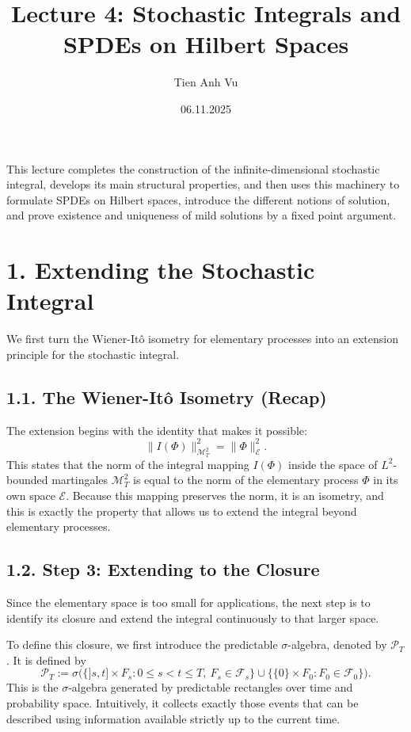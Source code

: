 \documentclass[11pt]{article}
\title{Lecture 4: Stochastic Integrals and SPDEs on Hilbert Spaces}
\date{06.11.2025}
\author{Tien Anh Vu}
\theoremstyle{definition}
\theoremstyle{remark}
\begin{document}
\maketitle

This lecture completes the construction of the infinite-dimensional stochastic integral, develops its main structural properties, and then uses this machinery to formulate SPDEs on Hilbert spaces, introduce the different notions of solution, and prove existence and uniqueness of mild solutions by a fixed point argument.

\section*{1. Extending the Stochastic Integral}
We first turn the Wiener-It\^o isometry for elementary processes into an extension principle for the stochastic integral.

\subsection*{1.1. The Wiener-It\^o Isometry (Recap)}
The extension begins with the identity that makes it possible:
\[
\|I(\Phi)\|_{\mathcal M_T^2}^2=\|\Phi\|_{\mathcal E}^2.
\]
This states that the norm of the integral mapping \(I(\Phi)\) inside the space of \(L^2\)-bounded martingales \(\mathcal M_T^2\) is equal to the norm of the elementary process \(\Phi\) in its own space \(\mathcal E\). Because this mapping preserves the norm, it is an isometry, and this is exactly the property that allows us to extend the integral beyond elementary processes.

\subsection*{1.2. Step 3: Extending to the Closure}
Since the elementary space is too small for applications, the next step is to identify its closure and extend the integral continuously to that larger space.

To define this closure, we first introduce the predictable \(\sigma\)-algebra, denoted by \(\mathcal P_T\). It is defined by
\[
\mathcal P_T
:=
\sigma\bigl(\{]s,t]\times F_s:0\le s<t\le T,\ F_s\in\mathcal F_s\}\cup\{\{0\}\times F_0:F_0\in\mathcal F_0\}\bigr).
\]
This is the \(\sigma\)-algebra generated by predictable rectangles over time and probability space.
Intuitively, it collects exactly those events that can be described using information available strictly up to the current time.
\end{document}
